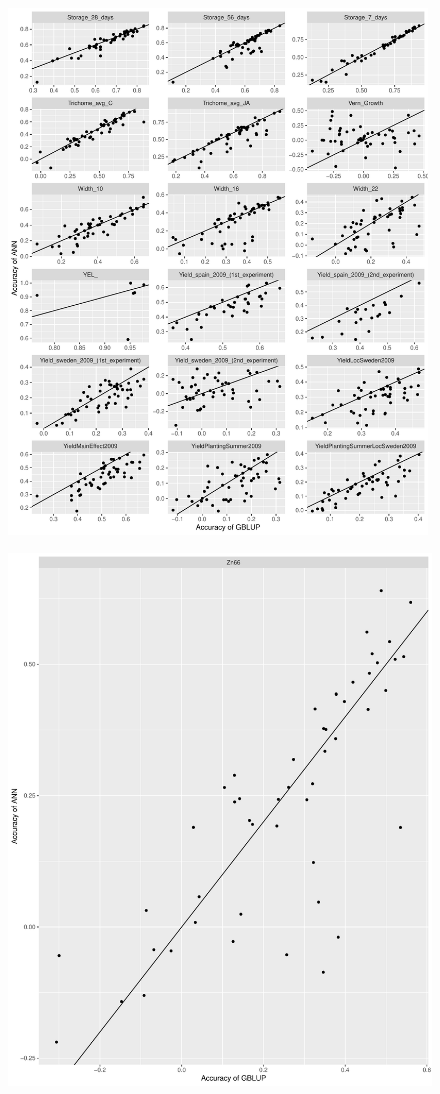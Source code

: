 \begin{figure}[H]
  \centering \includegraphics[height=0.99\textheight, width=0.99\textwidth]{Figures/cor_plots_7}
  \decoRule
 \label{fig:bla}
\end{figure}

\begin{figure}[H]
  \centering \includegraphics[height=.35\textheight, width=.65\textwidth]{Figures/cor_plots_8}
  \decoRule
 \label{fig:bla}
\end{figure}



